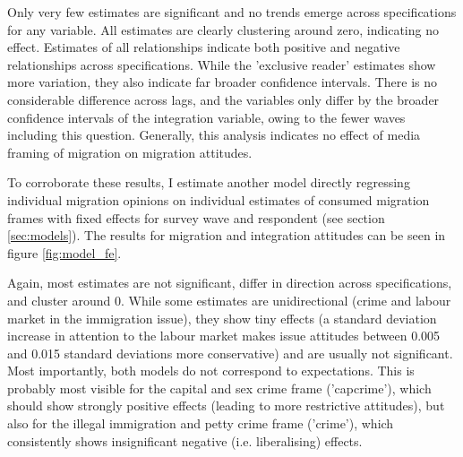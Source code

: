 \documentclass{article}
\begin{document}
Only very few estimates are significant and no trends emerge across specifications for any variable. All estimates are clearly clustering around zero, indicating no effect. Estimates of all relationships indicate both positive and negative relationships across specifications. While the 'exclusive reader' estimates show more variation, they also indicate far broader confidence intervals. There is no considerable difference across lags, and the variables only differ by the broader confidence intervals of the integration variable, owing to the fewer waves including this question. Generally, this analysis indicates no effect of media framing of migration on migration attitudes.


To corroborate these results, I estimate another model directly regressing individual migration opinions on individual estimates of consumed migration frames with fixed effects for survey wave and respondent (see section \ref{sec:models}). The results for migration and integration attitudes can be seen in figure \ref{fig:model_fe}.

Again, most estimates are not significant, differ in direction across specifications, and cluster around 0. While some estimates are unidirectional (crime and labour market in the immigration issue), they show tiny effects (a standard deviation increase in attention to the labour market makes issue attitudes between 0.005 and 0.015 standard deviations more conservative) and are usually not significant. Most importantly, both models do not correspond to expectations. This is probably most visible for the capital and sex crime frame ('capcrime'), which should show strongly positive effects (leading to more restrictive attitudes), but also for the illegal immigration and petty crime frame ('crime'), which consistently shows insignificant negative (i.e. liberalising) effects.
\end{document}
